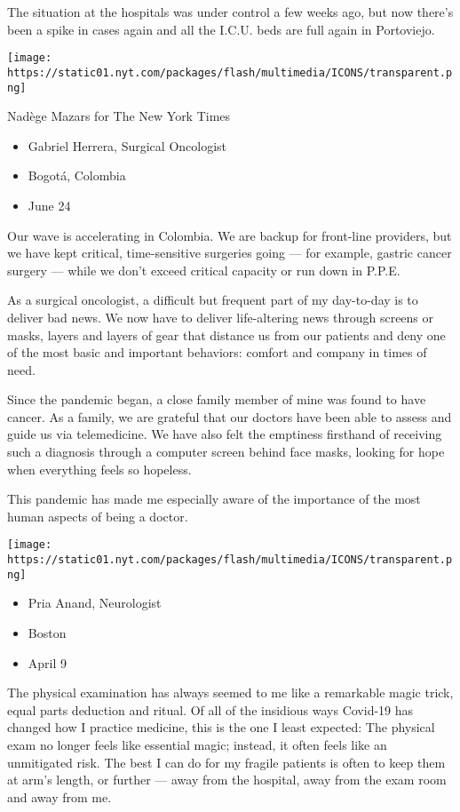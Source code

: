 The situation at the hospitals was under control a few weeks ago, but
now there's been a spike in cases again and all the I.C.U. beds are full
again in Portoviejo.

\texttt{[image: https://static01.nyt.com/packages/flash/multimedia/ICONS/transparent.png]}

Nadège Mazars for The New York Times

\begin{itemize}
\tightlist
\item
  Gabriel Herrera, Surgical Oncologist
\item
  Bogotá, Colombia
\item
  June 24
\end{itemize}

Our wave is accelerating in Colombia. We are backup for front-line
providers, but we have kept critical, time-sensitive surgeries going ---
for example, gastric cancer surgery --- while we don't exceed critical
capacity or run down in P.P.E.

As a surgical oncologist, a difficult but frequent part of my day-to-day
is to deliver bad news. We now have to deliver life-altering news
through screens or masks, layers and layers of gear that distance us
from our patients and deny one of the most basic and important
behaviors: comfort and company in times of need.

Since the pandemic began, a close family member of mine was found to
have cancer. As a family, we are grateful that our doctors have been
able to assess and guide us via telemedicine. We have also felt the
emptiness firsthand of receiving such a diagnosis through a computer
screen behind face masks, looking for hope when everything feels so
hopeless.

This pandemic has made me especially aware of the importance of the most
human aspects of being a doctor.

\texttt{[image: https://static01.nyt.com/packages/flash/multimedia/ICONS/transparent.png]}

\begin{itemize}
\tightlist
\item
  Pria Anand, Neurologist
\item
  Boston
\item
  April 9
\end{itemize}

The physical examination has always seemed to me like a remarkable magic
trick, equal parts deduction and ritual. Of all of the insidious ways
Covid-19 has changed how I practice medicine, this is the one I least
expected: The physical exam no longer feels like essential magic;
instead, it often feels like an unmitigated risk. The best I can do for
my fragile patients is often to keep them at arm's length, or further
--- away from the hospital, away from the exam room and away from me.

